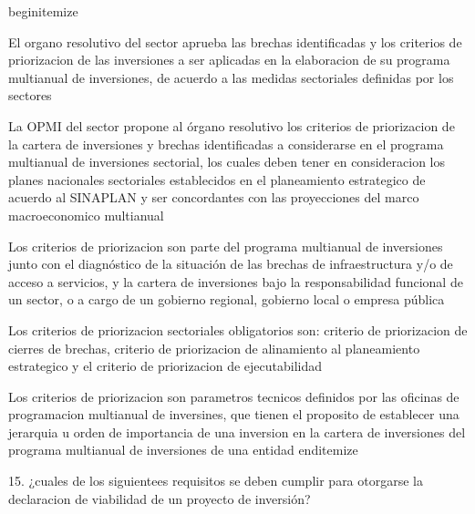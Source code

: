 begin{itemize}
			\item El organo resolutivo del sector aprueba las brechas identificadas y los criterios de priorizacion de las inversiones a ser aplicadas en la elaboracion de su programa multianual de inversiones, de acuerdo a las medidas sectoriales definidas por los sectores 
 			\item La OPMI del sector propone al órgano resolutivo los criterios de priorizacion de la cartera de inversiones y brechas identificadas a considerarse en el programa multianual de inversiones sectorial, los cuales deben tener en consideracion los planes nacionales sectoriales establecidos en el planeamiento estrategico de acuerdo al SINAPLAN y ser concordantes con las proyecciones del marco macroeconomico multianual 
			\item Los criterios de priorizacion son parte del programa multianual de inversiones junto con el diagnóstico de la situación de las brechas de infraestructura y/o de acceso a servicios, y la cartera de inversiones bajo la responsabilidad funcional de un sector, o a cargo de un gobierno regional, gobierno local o empresa pública 
			\item Los criterios de priorizacion sectoriales obligatorios son: criterio de priorizacion de cierres de brechas, criterio de priorizacion de alinamiento al planeamiento estrategico y el criterio de priorizacion de ejecutabilidad  
			\item Los criterios de priorizacion son parametros tecnicos definidos por las oficinas de programacion multianual de inversines, que tienen el proposito de establecer una jerarquia u orden de importancia de una inversion en la cartera de inversiones del programa multianual de inversiones de una entidad
end{itemize}

15. ¿cuales de los siguientees requisitos se deben cumplir para otorgarse la declaracion de viabilidad de un proyecto de inversión?


